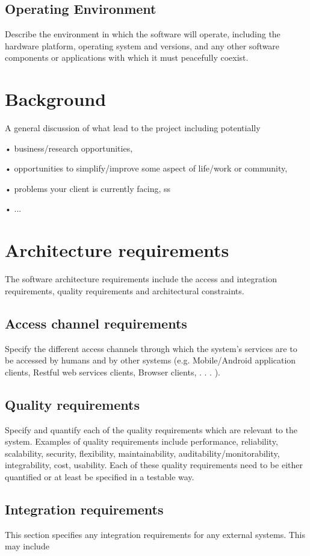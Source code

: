 \documentclass{scrreprt}
\begin{document}
\section{Operating Environment}
Describe the environment in which the software will operate, including the 
hardware platform, operating system and versions, and any other software 
components or applications with which it must peacefully coexist.

\chapter{Background}
A general discussion of what lead to the project including potentially

• business/research opportunities,

• opportunities to simplify/improve some aspect of life/work or community, 

• problems your client is currently facing,
ss

• ...

\chapter{Architecture requirements}

The software architecture requirements include the access and integration requirements, quality requirements and architectural constraints.

\section{Access channel requirements}
Specify the different access channels through which the system’s services are to be accessed by humans and by other systems (e.g. Mobile/Android application clients, Restful web services clients, Browser clients, . . . ).

\section{Quality requirements}
Specify and quantify each of the quality requirements which are relevant to the system. Examples of quality requirements include performance, reliability, scalability, security, flexibility, maintainability, auditability/monitorability, integrability, cost, usability. Each of these quality requirements need to be either quantified or at least be specified in a testable way.

\section{Integration requirements}
This section specifies any integration requirements for any external systems. This may include
\end{document}
